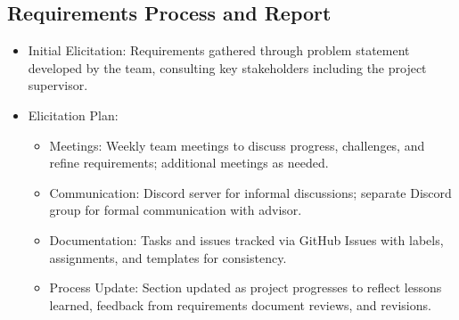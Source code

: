 \documentclass{article}
\begin{document}
\subsection{Requirements Process and Report}\label{subsec:reqprocess}
\begin{itemize}
    \item {Initial Elicitation}: Requirements gathered through problem statement developed by the team, consulting key stakeholders including the project supervisor.
    \item {Elicitation Plan}:
    \begin{itemize}
        \item Meetings: Weekly team meetings to discuss progress, challenges, and refine requirements; additional meetings as needed.
        \item Communication: Discord server for informal discussions; separate Discord group for formal communication with advisor.
        \item Documentation: Tasks and issues tracked via GitHub Issues with labels, assignments, and templates for consistency.
        \item Process Update: Section updated as project progresses to reflect lessons learned, feedback from requirements document reviews, and revisions.
    \end{itemize}
\end{itemize}
\end{document}
